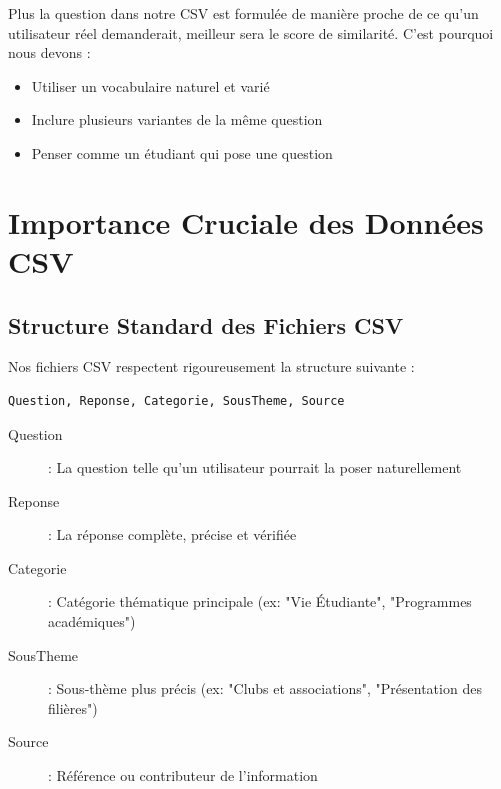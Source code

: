 \documentclass[11pt,a4paper]{article}
\begin{document}
\begin{astuce}
Plus la question dans notre CSV est formulée de manière proche de ce qu'un utilisateur réel demanderait, meilleur sera le score de similarité. C'est pourquoi nous devons :
\begin{itemize}
    \item Utiliser un vocabulaire naturel et varié
    \item Inclure plusieurs variantes de la même question
    \item Penser comme un étudiant qui pose une question
\end{itemize}
\end{astuce}

\clearpage

\section{Importance Cruciale des Données CSV}
\label{sec:donnees_csv}

\subsection{Structure Standard des Fichiers CSV}

Nos fichiers CSV respectent rigoureusement la structure suivante :

\begin{lstlisting}[language=bash, caption=Format CSV Standard]
Question, Reponse, Categorie, SousTheme, Source
\end{lstlisting}

\begin{info}
\begin{description}
    \item[Question] : La question telle qu'un utilisateur pourrait la poser naturellement
    \item[Reponse] : La réponse complète, précise et vérifiée
    \item[Categorie] : Catégorie thématique principale (ex: "Vie Étudiante", "Programmes académiques")
    \item[SousTheme] : Sous-thème plus précis (ex: "Clubs et associations", "Présentation des filières")
    \item[Source] : Référence ou contributeur de l'information
\end{description}
\end{info}
\end{document}
